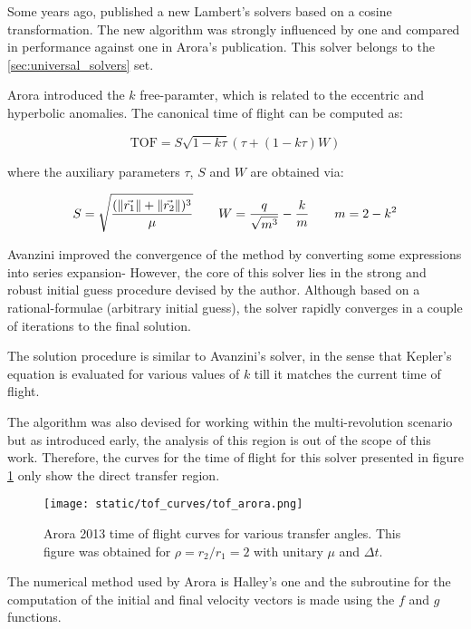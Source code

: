 Some years ago, \cite{arora2013} published a new Lambert's solvers based on a
cosine transformation. The new algorithm was strongly influenced by
\cite{bate1971} one and compared in performance against \cite{gooding1990} one
in Arora's publication. This solver belongs to the \ref{sec:universal_solvers}
set.

Arora introduced the $k$ free-paramter, which is related to the eccentric and
hyperbolic anomalies. The canonical time of flight can be computed as:

\begin{equation}
	\text{TOF} = S\sqrt{1 - k\tau}(\tau + (1 - k\tau)W)
\end{equation}

where the auxiliary parameters $\tau$, $S$ and $W$ are obtained via:

\begin{equation}
  S = \sqrt{\frac{(\lVert\vec{r_1}\rVert + \lVert\vec{r_2}\rVert)^3}{\mu}}\quad\quad
  W = \frac{q}{\sqrt{m ^3}} - \frac{k}{m}\quad\quad
  m = 2 - k^2
\end{equation}

Avanzini improved the convergence of the method by converting some expressions
into series expansion- However, the core of this solver lies in the strong and
robust initial guess procedure devised by the author. Although based on a
rational-formulae (arbitrary initial guess), the solver rapidly converges in a
couple of iterations to the final solution.

The solution procedure is similar to Avanzini's solver, in the sense that
Kepler's equation is evaluated for various values of $k$ till it matches the
current time of flight.

The algorithm was also devised for working within the multi-revolution scenario
but as introduced early, the analysis of this region is out of the scope of this
work. Therefore, the curves for the time of flight for this solver presented in
figure \ref{fig:tof_arora} only show the direct transfer region.

\vspace{0.5cm}
\begin{figure}[h]
  \centering
  \texttt{[image: static/tof\_curves/tof\_arora.png]}
  \caption{Arora 2013 time of flight curves for various transfer angles. This
  figure was obtained for $\rho=r_2/r_1=2$ with unitary $\mu$ and $\Delta t$.}
  \label{fig:tof_arora}
\end{figure}

The numerical method used by Arora is Halley's one and the subroutine for the
computation of the initial and final velocity vectors is made using the $f$ and
$g$ functions.


